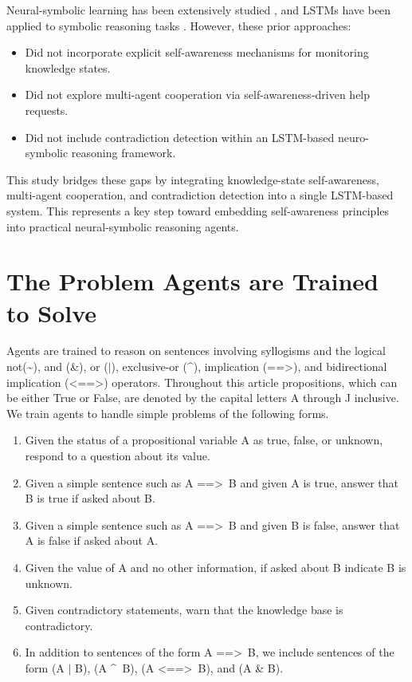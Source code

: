 \documentclass{article}
\begin{document}
Neural-symbolic learning has been extensively studied \cite{neural_symbolic_2007, bica2015_integrated_neural_symbolic, captcha_2017}, and LSTMs have been applied to symbolic reasoning tasks \cite{DBLP:journals/corr/abs-1802-08535}. However, these prior approaches:
\begin{itemize}
    \item Did not incorporate explicit self-awareness mechanisms for monitoring knowledge states.
    \item Did not explore multi-agent cooperation via self-awareness-driven help requests.
    \item Did not include contradiction detection within an LSTM-based neuro-symbolic reasoning framework.
\end{itemize}

This study bridges these gaps by integrating knowledge-state self-awareness, multi-agent cooperation, and contradiction detection into a single LSTM-based system. This represents a key step toward embedding self-awareness principles into practical neural-symbolic reasoning agents.

\section{The Problem Agents are Trained to Solve}

Agents are trained to reason on sentences involving syllogisms and the logical not(\textasciitilde), and (\&), or ($|$), exclusive-or (\textasciicircum), implication (==\textgreater), and bidirectional implication (\textless==\textgreater) operators. Throughout this article propositions, which can be either True or False, are denoted by the capital letters A through J inclusive. We train agents to handle simple problems of the following forms.

\begin{enumerate}
	\item Given the status of a propositional variable A as true, false, or unknown, respond to a question about its value.
	\item Given a simple sentence such as A ==\textgreater \, B and given A is true, answer that B is true if asked about B.
	\item Given a simple sentence such as A ==\textgreater \, B and given B is false, answer that A is false if asked about A.
	\item Given the value of A and no other information, if asked about B indicate B is unknown.
	\item Given contradictory statements, warn that the knowledge base is contradictory.
	\item In addition to sentences of the form A ==\textgreater \, B, we include sentences of the form (A $|$ B), (A \textasciicircum \, B), (A \textless ==\textgreater \, B), and (A \&  B).
\end{enumerate}
\end{document}
